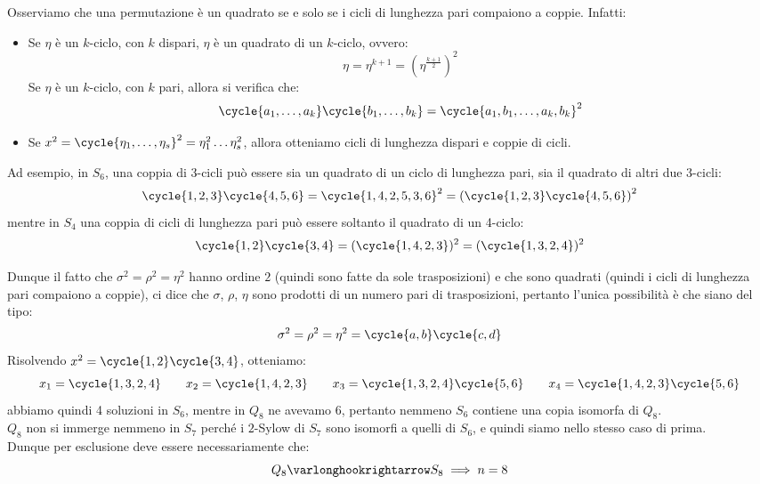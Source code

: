 \documentclass[11pt]{scrartcl}
\begin{document}
\begin{soln}
    \begin{remark}
        Osserviamo che una permutazione è un quadrato se e solo se i cicli di lunghezza pari compaiono a coppie. Infatti:
            \begin{itemize}
                \item Se $\eta$ è un $k$-ciclo, con $k$ dispari, $\eta$ è un quadrato di un $k$-ciclo, ovvero:
                        \[ \eta = \eta^{k+1} = \left(\eta^{\frac{k+1}{2}}\right)^2
                            \]
                Se $\eta$ è un $k$-ciclo, con $k$ pari, allora si verifica che:
                        \[ \cycle{a_1,\ldots,a_k}\cycle{b_1,\ldots,b_k} = \cycle{a_1,b_1,\ldots,a_k,b_k}^2
                            \]
                \item Se $x^2 = \cycle{\eta_1, \ldots, \eta_s}^2 = \eta_1^2 \ldots \eta_s^2$, allora otteniamo cicli di lunghezza dispari e coppie di cicli.
            \end{itemize}
        Ad esempio, in $S_6$, una coppia di 3-cicli può essere sia un quadrato di un ciclo di lunghezza pari, sia il quadrato di altri due 3-cicli:
            \[ \cycle{1,2,3}\cycle{4,5,6} = \cycle{1,4,2,5,3,6}^2 = \left(\cycle{1,2,3}\cycle{4,5,6}\right)^2
                \]
        mentre in $S_4$ una coppia di cicli di lunghezza pari può essere soltanto il quadrato di un 4-ciclo:
            \[ \cycle{1,2}\cycle{3,4} = (\cycle{1,4,2,3})^2 = (\cycle{1,3,2,4})^2
                \]
    \end{remark}
    Dunque il fatto che $\sigma^2 = \rho^2 = \eta^2$ hanno ordine $2$ (quindi sono fatte da sole trasposizioni) e che sono quadrati (quindi i cicli di lunghezza pari compaiono a coppie),
    ci dice che $\sigma$, $\rho$, $\eta$ sono prodotti di un numero pari di trasposizioni, pertanto l'unica possibilità è che siano del tipo:
        \[ \sigma^2 = \rho^2 = \eta^2 = \cycle{a,b}\cycle{c,d}
            \]
    Risolvendo $x^2 = \cycle{1,2}\cycle{3,4}$, otteniamo:
        \[ x_1 = \cycle{1,3,2,4} \qquad x_2 = \cycle{1,4,2,3} \qquad x_3 = \cycle{1,3,2,4}\cycle{5,6} \qquad x_4 = \cycle{1,4,2,3}\cycle{5,6}
            \]
    abbiamo quindi 4 soluzioni in $S_6$, mentre in $Q_8$ ne avevamo 6, pertanto nemmeno $S_6$ contiene una copia isomorfa di $Q_8$.\\
    $Q_8$ non si immerge nemmeno in $S_7$ perché i $2$-Sylow di $S_7$ sono isomorfi a quelli di $S_6$, e quindi siamo nello stesso caso di prima. \\
    Dunque per esclusione deve essere necessariamente che:
        \[ Q_8 \varlonghookrightarrow S_8 \implies n = 8
\]
\end{soln}
\end{document}
